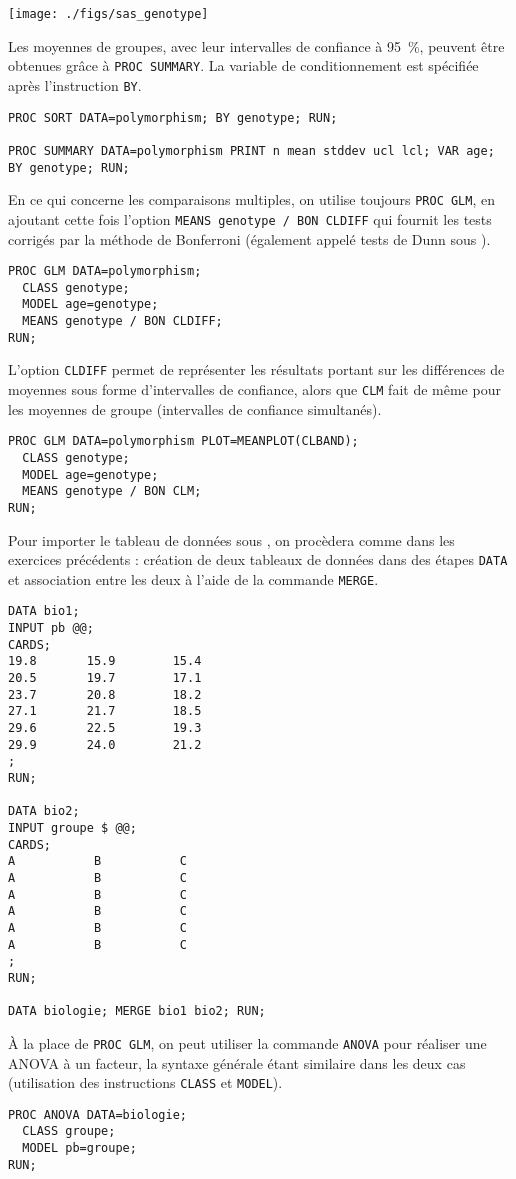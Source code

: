 \texttt{[image: ./figs/sas\_genotype]}

Les moyennes de groupes, avec leur intervalles de confiance à 95~\%, peuvent
être obtenues grâce à \texttt{PROC SUMMARY}. La variable de conditionnement
est spécifiée après l'instruction \texttt{BY}.
\begin{verbatim}
PROC SORT DATA=polymorphism; BY genotype; RUN;

PROC SUMMARY DATA=polymorphism PRINT n mean stddev ucl lcl; VAR age; BY genotype; RUN;
\end{verbatim}

En ce qui concerne les comparaisons multiples, on utilise toujours
\texttt{PROC GLM}, en ajoutant cette fois l'option 
\verb|MEANS genotype / BON CLDIFF| qui fournit les tests corrigés par la
méthode de Bonferroni (également appelé tests de Dunn sous \SAS). 
\begin{verbatim}
PROC GLM DATA=polymorphism; 
  CLASS genotype; 
  MODEL age=genotype;
  MEANS genotype / BON CLDIFF;
RUN;
\end{verbatim}
L'option
\texttt{CLDIFF} permet de représenter les résultats portant sur les
différences de moyennes sous forme d'intervalles de confiance, alors que
\texttt{CLM} fait de même pour les moyennes de groupe (intervalles de
confiance simultanés).
\begin{verbatim}
PROC GLM DATA=polymorphism PLOT=MEANPLOT(CLBAND); 
  CLASS genotype; 
  MODEL age=genotype;
  MEANS genotype / BON CLM;
RUN;
\end{verbatim}
%
%
%
\soln{\ref{exo:9.6}}
Pour importer le tableau de données sous \SAS, on procèdera comme dans les
exercices précédents : création de deux tableaux de données dans des étapes
\texttt{DATA} et association entre les deux à l'aide de la commande
\texttt{MERGE}.
\begin{verbatim}
DATA bio1;
INPUT pb @@;
CARDS;
19.8       15.9        15.4
20.5       19.7        17.1
23.7       20.8        18.2
27.1       21.7        18.5
29.6       22.5        19.3
29.9       24.0        21.2
;
RUN;

DATA bio2;
INPUT groupe $ @@;
CARDS;
A           B           C
A           B           C
A           B           C
A           B           C
A           B           C
A           B           C
;
RUN;

DATA biologie; MERGE bio1 bio2; RUN;
\end{verbatim}

À la place de \texttt{PROC GLM}, on peut utiliser la commande \texttt{ANOVA}
pour réaliser une ANOVA à un facteur, la syntaxe générale étant similaire
dans les deux cas (utilisation des instructions \texttt{CLASS} et
\texttt{MODEL}). 
\begin{verbatim}
PROC ANOVA DATA=biologie; 
  CLASS groupe; 
  MODEL pb=groupe;
RUN;
\end{verbatim}

